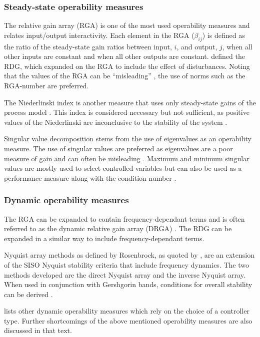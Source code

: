 \subsubsection{Steady-state operability measures}
The relative gain array (RGA) is one of the most used operability measures \citep[576]{luyben} and relates input/output interactivity.
Each element in the RGA ($\beta_{ij}$) is defined as the ratio of the steady-state gain ratios between input, $i$, and output, $j$, when all other inputs are constant and when all other outputs are constant.
\citet{artrdg} defined the RDG, which expanded on the RGA to include the effect of disturbances. 
Noting that the values of the RGA can be ``misleading'' \citep[87]{skogestad}, the use of norms such as the RGA-number are preferred.

The Niederlinski index is another measure that uses only steady-state gains of the process model \citep[572-573]{luyben}. 
This index is considered necessary but not sufficient, as positive values of the Niederlinski are inconclusive to the stability of the system \citep[445]{skogestad}.

Singular value decomposition stems from the use of eigenvalues as an operability measure. 
The use of singular values are preferred as eigenvalues are a poor
measure of gain and can often be misleading \citep[75]{skogestad}.
Maximum and minimum singular values are mostly used to select controlled variables but can also be used as a performance measure along with the condition number .

\subsubsection{Dynamic operability measures}
The RGA can be expanded to contain frequency-dependant terms and is often referred to as the dynamic relative gain array (DRGA) \citep[637]{marlin}. 
The RDG \citep{artrdg} can be expanded in a similar way to include frequency-dependant terms.

Nyquist array methods as defined by Rosenbrock, as quoted by \citet[92]{skogestad}, are an extension of the SISO Nyquist stability criteria that include frequency dynamics. 
The two methods developed are the direct Nyquist array and the inverse Nyquist array. 
When used in conjunction with Gershgorin bands, conditions for overall stability can be derived \citep[440]{skogestad}.

\citet{vinsonphd} lists other dynamic operability measures which rely on the choice of a controller type. Further shortcomings of the above mentioned operability measures are also discussed in that text. 

